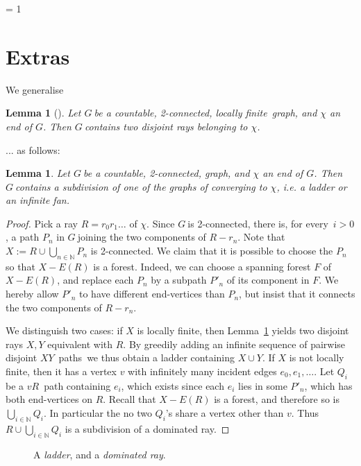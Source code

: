 \documentclass{article}
\newcommand{\Debug}{0}
\newcommand{\defi}[1]{{\color{darkgray}\emph{#1}}}
\newtheorem{lemma}[proposition]{Lemma}
\newcommand{\N}{\ensuremath{\mathbb N}}
\newcommand{\nin}{\ensuremath{{n\in\N}}}
\newcommand{\pth}[2]{\ensuremath{#1}\text{--}\ensuremath{#2}~path}
\newcommand{\pths}[2]{\ensuremath{#1}\text{--}\ensuremath{#2}~paths}
\newcommand{\g}{\ensuremath{G\ }}
\newcommand{\G}{\ensuremath{G}}
\newcommand{\Lr}[1]{Lemma~\ref{#1}}
\newcommand{\lf}{locally finite}
\newcommand{\fe}{for every}
\newcommand{\ti}{there is}
\newcommand{\extras}[1]{\ifnum \Debug = 1
\section{Extras} #1
 \fi
}
\begin{document}



\extras{

We generalise 
\begin{lemma}[\cite{halin74}] \label{LemHal}
Let \g be a countable, 2-connected, \lf\ graph, and $\chi$ an end of \G. Then \g contains two disjoint rays belonging to $\chi$.
\end{lemma}

... as follows: 

\begin{lemma} \label{LemLadFan}
Let \g be a countable, 2-connected, graph, and $\chi$ an end of \G. Then \g contains a subdivision of one of the graphs of \fig{} converging to $\chi$, i.e. a ladder or an infinite fan.
\end{lemma}
\begin{proof}
Pick a ray $R=r_0 r_1 \ldots$ of $\chi$. Since \g is 2-connected, \ti, \fe\ $i>0$, a path $P_n$ in \g joining the two components of $R-r_n$. Note that $X:= R \cup \bigcup_\nin P_n$ is 2-connected. We claim that it is possible to choose the $P_n$ so that $X - E(R)$ is a forest. Indeed, we can choose a spanning forest $F$ of $X - E(R)$, and replace each $P_n$ by a subpath $P'_n$ of its component in $F$. We hereby allow $P'_n$ to have different end-vertices than $P_n$, but insist that it connects the two components of $R-r_n$. 

We distinguish two cases: if $X$ is \lf, then \Lr{LemHal} yields two disjoint rays $X,Y$ equivalent with $R$. By greedily adding an infinite sequence of pairwise disjoint \pths{X}{Y}\ we thus obtain a ladder containing $X \cup Y$. If  $X$ is not \lf, then it has a vertex $v$ with infinitely many incident edges $e_0,e_1, \ldots$. Let $Q_i$ be a \pth{v}{R} containing $e_i$, which exists since each $e_i$ lies in some $P'_n$, which has both end-vertices on $R$. Recall that $X - E(R)$ is a forest, and therefore so is $\bigcup_{i\in \N} Q_i$. In particular the no two $Q_i$'s share a vertex other than $v$. Thus $R \cup \bigcup_{i\in \N} Q_i$ is a subdivision of a dominated ray.
\end{proof}


\begin{figure} 
\begin{center}
\end{center}
\caption{A \defi{ladder}, and a \defi{dominated ray}.} \label{figLadStar}
\end{figure}

}
\end{document}
